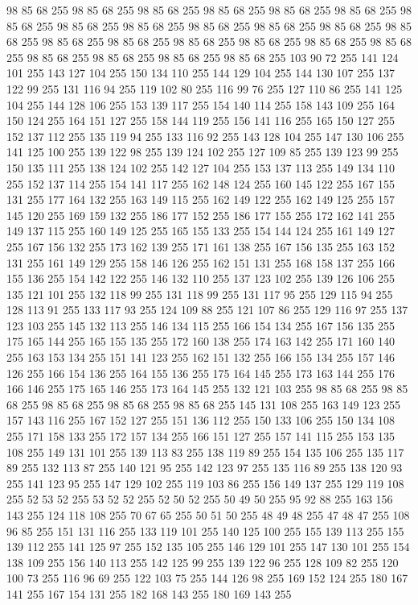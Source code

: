 98 85 68 255 98 85 68 255 98 85 68 255 98 85 68 255 98 85 68 255 98 85 68 255 98 85 68 255 98 85 68 255 98 85 68 255 98 85 68 255 98 85 68 255 98 85 68 255 98 85 68 255 98 85 68 255 98 85 68 255 98 85 68 255 98 85 68 255 98 85 68 255 98 85 68 255 98 85 68 255 98 85 68 255 98 85 68 255 98 85 68 255 103 90 72 255 141 124 101 255 143 127 104 255 150 134 110 255 144 129 104 255 144 130 107 255 137 122 99 255 131 116 94 255 119 102 80 255 116 99 76 255 127 110 86 255 141 125 104 255 144 128 106 255 153 139 117 255 154 140 114 255 158 143 109 255 164 150 124 255 164 151 127 255 158 144 119 255 156 141 116 255 165 150 127 255 152 137 112 255 135 119 94 255 133 116 92 255 143 128 104 255 147 130 106 255 141 125 100 255 139 122 98 255 139 124 102 255 127 109 85 255 139 123 99 255 150 135 111 255 138 124 102 255 142 127 104 255 153 137 113 255 149 134 110 255 152 137 114 255 154 141 117 255 162 148 124 255 160 145 122 255 167 155 131 255
177 164 132 255 163 149 115 255 162 149 122 255 162 149 125 255 157 145 120 255 169 159 132 255 186 177 152 255 186 177 155 255 172 162 141 255 149 137 115 255 160 149 125 255 165 155 133 255 154 144 124 255 161 149 127 255 167 156 132 255 173 162 139 255 171 161 138 255 167 156 135 255 163 152 131 255 161 149 129 255 158 146 126 255 162 151 131 255 168 158 137 255 166 155 136 255 154 142 122 255 146 132 110 255 137 123 102 255 139 126 106 255 135 121 101 255 132 118 99 255 131 118 99 255 131 117 95 255 129 115 94 255 128 113 91 255 133 117 93 255 124 109 88 255 121 107 86 255 129 116 97 255 137 123 103 255 145 132 113 255 146 134 115 255 166 154 134 255 167 156 135 255 175 165 144 255 165 155 135 255 172 160 138 255 174 163 142 255 171 160 140 255 163 153 134 255 151 141 123 255 162 151 132 255 166 155 134 255 157 146 126 255 166 154 136 255 164 155 136 255 175 164 145 255 173 163 144 255 176 166 146 255 175 165 146 255 173 164 145 255 132 121 103 255 98 85 68 255 98 85 68 255 98 85 68 255
98 85 68 255 98 85 68 255 145 131 108 255 163 149 123 255 157 143 116 255 167 152 127 255 151 136 112 255 150 133 106 255 150 134 108 255 171 158 133 255 172 157 134 255 166 151 127 255 157 141 115 255 153 135 108 255 149 131 101 255 139 113 83 255 138 119 89 255 154 135 106 255 135 117 89 255 132 113 87 255 140 121 95 255 142 123 97 255 135 116 89 255 138 120 93 255 141 123 95 255 147 129 102 255 119 103 86 255 156 149 137 255 129 119 108 255 52 53 52 255 53 52 52 255 52 50 52 255 50 49 50 255 95 92 88 255 163 156 143 255 124 118 108 255 70 67 65 255 50 51 50 255 48 49 48 255 47 48 47 255 108 96 85 255 151 131 116 255 133 119 101 255 140 125 100 255 155 139 113 255 155 139 112 255 141 125 97 255 152 135 105 255 146 129 101 255 147 130 101 255 154 138 109 255 156 140 113 255 142 125 99 255 139 122 96 255 128 109 82 255 120 100 73 255 116 96 69 255 122 103 75 255 144 126 98 255 169 152 124 255 180 167 141 255 167 154 131 255 182 168 143 255 180 169 143 255
